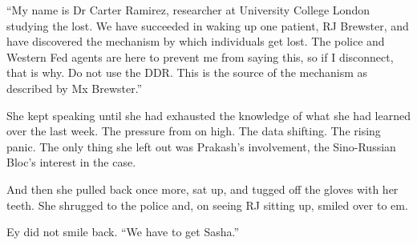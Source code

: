 ``My name is Dr Carter Ramirez, researcher at University College London studying the lost. We have succeeded in waking up one patient, RJ Brewster, and have discovered the mechanism by which individuals get lost. The police and Western Fed agents are here to prevent me from saying this, so if I disconnect, that is why. Do not use the DDR. This is the source of the mechanism as described by Mx Brewster.''

She kept speaking until she had exhausted the knowledge of what she had learned over the last week. The pressure from on high. The data shifting. The rising panic. The only thing she left out was Prakash's involvement, the Sino-Russian Bloc's interest in the case.

And then she pulled back once more, sat up, and tugged off the gloves with her teeth. She shrugged to the police and, on seeing RJ sitting up, smiled over to em.

Ey did not smile back. ``We have to get Sasha.''
